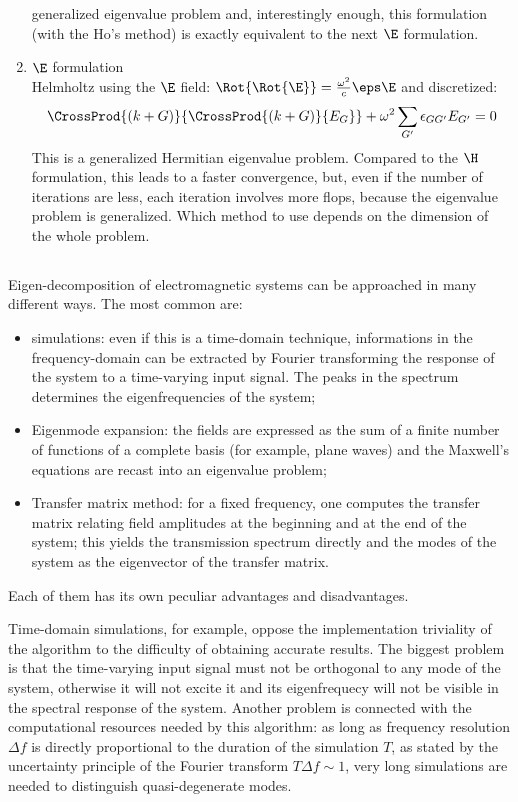 \begin{enumerate}
  generalized eigenvalue problem and, interestingly enough, this
  formulation (with the Ho's method) is exactly equivalent to the next
  $\E$ formulation.
\item
  $\E$ formulation\\
  Helmholtz using the $\E$ field:
  $\Rot{\Rot{\E}} = \frac{\omega^2}{c}\eps\E$
  and discretized:
  $$\CrossProd{(k + G)}{\CrossProd{(k + G)}{E_G}} + \omega^2 \sum_{G'}
  \epsilon_{GG'}E_{G'} = 0$$
  This is a generalized Hermitian eigenvalue problem. Compared to the
  $\H$ formulation, this leads to a faster convergence, but, even if
  the number of iterations are less, each iteration involves more
  flops, because the eigenvalue problem is generalized. Which method
  to use depends on the dimension of the whole problem.
\end{enumerate}

\subsection{\cite{johnson_block}}

Eigen-decomposition of electromagnetic systems can be approached in
many different ways. The most common are:
\begin{itemize}
\item
   simulations: even if this is a time-domain technique,
  informations in the frequency-domain can be extracted by Fourier
  transforming the response of the system to a time-varying input
  signal. The peaks in the spectrum determines the eigenfrequencies of
  the system;
\item
  Eigenmode expansion: the fields are expressed as the sum of a finite
  number of functions of a complete basis (for example, plane waves)
  and the Maxwell's equations are recast into an eigenvalue problem;
\item
  Transfer matrix method: for a fixed frequency, one computes the
  transfer matrix relating field amplitudes at the beginning and at
  the end of the system; this yields the transmission spectrum
  directly and the modes of the system as the eigenvector of the
  transfer matrix.
\end{itemize}

Each of them has its own peculiar advantages and disadvantages.

Time-domain simulations, for example, oppose the
implementation triviality of the algorithm to the difficulty of
obtaining accurate results. The biggest problem is that the
time-varying input signal must not be orthogonal to any mode of the
system, otherwise it will not excite it and its eigenfrequecy will not
be visible in the spectral response of the system. Another problem is
connected with the computational resources needed by this algorithm:
as long as frequency resolution $\Delta f$ is directly proportional to the
duration of the simulation $T$, as stated by the uncertainty principle of
the Fourier transform $T\Delta f \sim 1$, very long simulations are
needed to distinguish quasi-degenerate modes.

